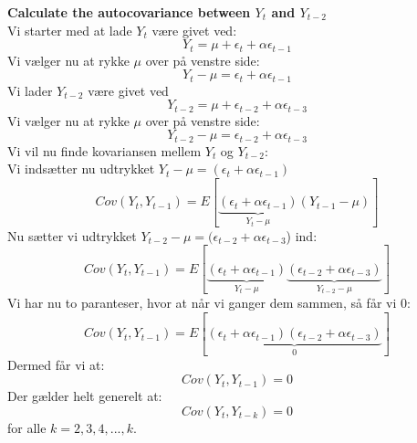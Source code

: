 \documentclass[
  10pt,
]{article}
\begin{document}
\textbf{Calculate the autocovariance between $Y_t$ and $Y_{t-2}$}\\
Vi starter med at lade \(Y_t\) være givet ved:\\
\[Y_t = \mu + \epsilon_t + \alpha \epsilon_{t-1} \] Vi vælger nu at
rykke \(\mu\) over på venstre side:\\
\[Y_t - \mu = \epsilon_t + \alpha \epsilon_{t-1} \] Vi lader \(Y_{t-2}\)
være givet ved\\
\[Y_{t-2} = \mu + \epsilon_{t-2} + \alpha \epsilon_{t-3} \] Vi vælger nu
at rykke \(\mu\) over på venstre side:\\
\[Y_{t-2} - \mu = \epsilon_{t-2} + \alpha \epsilon_{t-3} \] Vi vil nu
finde kovariansen mellem \(Y_t\) og \(Y_{t-2}\):\\
Vi indsætter nu udtrykket
\(Y_t - \mu = (\epsilon_t + \alpha \epsilon_{t-1})\)\\
\[Cov(Y_t,Y_{t-1}) = E[\underbrace{(\epsilon_t + \alpha \epsilon_{t-1})}_\text{$Y_t - \mu$}(Y_{t-1}-\mu)] \]
Nu sætter vi udtrykket
\(Y_{t-2} - \mu = (\epsilon_{t-2} + \alpha \epsilon_{t-3}\)) ind:\\
\[Cov(Y_t,Y_{t-1}) = E[\underbrace{(\epsilon_t + \alpha \epsilon_{t-1})}_\text{$Y_t - \mu$}\underbrace{(\epsilon_{t-2} + \alpha \epsilon_{t-3})}_\text{$Y_{t-2} - \mu$}] \]
Vi har nu to paranteser, hvor at når vi ganger dem sammen, så får vi
0:\\
\[Cov(Y_t,Y_{t-1}) = E[\underbrace{(\epsilon_t + \alpha \epsilon_{t-1})(\epsilon_{t-2} + \alpha \epsilon_{t-3})}_\text{0}] \]
Dermed får vi at:\\
\[Cov(Y_t,Y_{t-1}) = 0 \] Der gælder helt generelt at:\\
\[Cov(Y_t,Y_{t-k})=0 \] for alle \(k = 2,3,4, ... , k\).\\

\newpage
\end{document}
